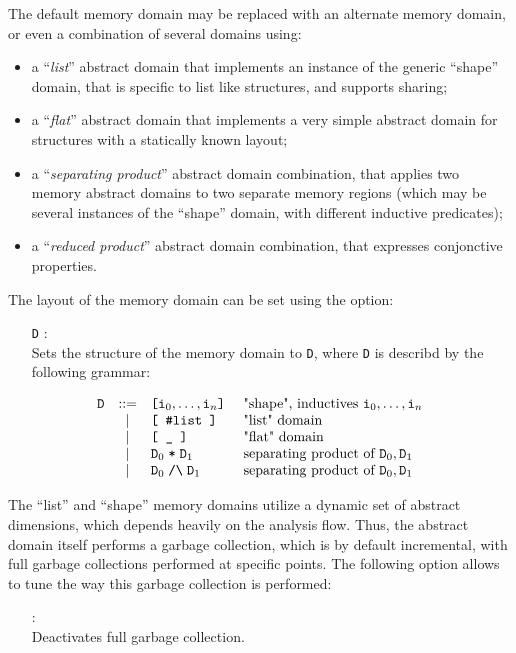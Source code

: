 The default memory domain may be replaced with an alternate memory
domain, or even a combination of several domains using:
\label{opt:shaped}
\begin{itemize}
\item a ``{\em list}'' abstract domain that implements an instance of
  the generic ``shape'' domain, that is specific to list like structures,
  and supports sharing;
\item a ``{\em flat}'' abstract domain that implements a very simple
  abstract domain for structures with a statically known layout;
\item a ``{\em separating product}'' abstract domain combination, that
  applies two memory abstract domains to two separate memory regions
  (which may be several instances of the ``shape'' domain, with different
  inductive predicates);
\item a ``{\em reduced product}'' abstract domain combination, that
  expresses conjonctive properties.
\end{itemize}
The layout of the memory domain can be set using the option:
\begin{itemize}
\item[\doption{-shape-dom} \texttt{D}]: \\
  Sets the structure of the memory domain to \texttt{D}, where
  \texttt{D} is describd by the following grammar:
\end{itemize}
\[
\begin{array}{rcll}
  \texttt{D}
  & ::=
  & \texttt{[} \texttt{i}_0, \ldots, \texttt{i}_n \texttt{]}
  & \text{ "shape", inductives } \texttt{i}_0, \ldots,
  \texttt{i}_n
  \\
  & |
  & \texttt{[ \#list ]}
  & \text{ "list" domain}
  \\
  & |
  & \texttt{[ \_ ]}
  & \text{ "flat" domain}
  \\
  & |
  & \texttt{D}_0 \; \texttt{*} \; \texttt{D}_1
  & \text{ separating product of } \texttt{D}_0, \texttt{D}_1
  \\
  & |
  & \texttt{D}_0 \; \verb#/\# \; \texttt{D}_1
  & \text{ separating product of } \texttt{D}_0, \texttt{D}_1
  \\
\end{array}
\]
\vspace{0.5\baselineskip}

The ``list'' and ``shape'' memory domains utilize a dynamic set of
abstract dimensions, which depends heavily on the analysis flow.
Thus, the abstract domain itself performs a garbage collection, which
is by default incremental, with full garbage collections performed at
specific points.
The following option allows to tune the way this garbage collection
is performed:
\label{opt:internal}
\begin{itemize}
\item[\doption{-no-full-gc}] \optadv: \\
  Deactivates full garbage collection.
\end{itemize}


